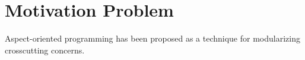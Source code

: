 \section{Motivation Problem}

Aspect-oriented programming has been proposed as a technique for modularizing crosscutting concerns. 
